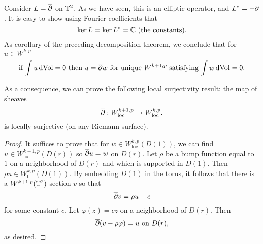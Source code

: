 \documentclass{amsart}
\begin{document}
 
 \begin{example}
   Consider $L=\overline{\partial}$ on $\mathbb{T}^{2}$. As we have seen, this is an
   elliptic operator, and $L^{*}=-\partial$. It is easy to show using
   Fourier coefficients that
   \begin{equation*}
     \ker L=\ker L^{*}=\mathbb{C}\text{ (the constants)}.
   \end{equation*}
   As corollary of the preceding decomposition theorem, we conclude
   that for $u\in W^{k,p}$
   \begin{equation*}
     \text{if $\int u\,\mathrm{dVol}=0$ then $u=\overline{\partial} w$ for unique $W^{k+1,p}$ satisfying
       $\int w\, \mathrm{dVol}=0$}.
   \end{equation*}
   
   As a consequence, we can prove the following local surjectivity
   result: the map of sheaves
   \begin{equation*}
     \overline{\partial}:W^{k+1,p}_{\text{loc}}\to W^{k,p}_{\text{loc}}.
   \end{equation*}
   is locally surjective (on any Riemann surface).

   \begin{proof}
     It suffices to prove that for $w\in W^{k,p}_{\text{loc}}(D(1))$,
     we can find $u\in W^{k+1,p}_{\text{loc}}(D(r))$ so $\overline{\partial} u=w$
     on $D(r)$. Let $\rho$ be a bump function equal to $1$ on a
     neighborhood of $D(r)$ and which is supported in $D(1)$. Then
     $\rho u\in W^{k,p}_{0}(D(1))$. By embedding $D(1)$ in the torus,
     it follows that there is a $W^{k+1,p}(\mathbb{T}^{2})$ section $v$ so
     that
     \begin{equation*}
       \overline{\partial} v=\rho u+c
     \end{equation*}
     for some constant $c$. Let $\varphi(z)=cz$ on a neighborhood of
     $D(r)$. Then
     \begin{equation*}
       \overline{\partial}(v-\rho \varphi)=u\text{ on $D(r)$},
     \end{equation*}
     as desired.    
   \end{proof}  
 \end{example}
\end{document}
